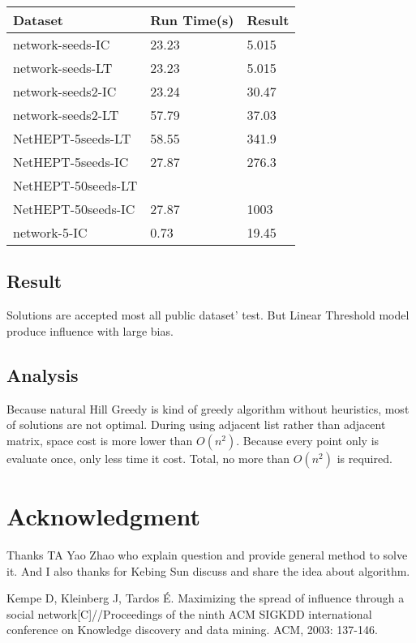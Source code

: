 \documentclass[conference,compsoc]{IEEEtran}
\begin{document}
\begin{center}
   \begin{tabular}{| l | l | l |}
   \hline
    Dataset             &Run Time(s)   &Result   \\ \hline
    network-seeds-IC     & 23.23        & 5.015  \\
    network-seeds-LT     & 23.23        & 5.015  \\
    network-seeds2-IC    & 23.24        & 30.47  \\ 
    network-seeds2-LT    & 57.79        & 37.03  \\
    NetHEPT-5seeds-LT    & 58.55        & 341.9  \\
    NetHEPT-5seeds-IC    & 27.87        & 276.3  \\
    NetHEPT-50seeds-LT    &         &   \\
    NetHEPT-50seeds-IC    & 27.87        & 1003  \\
    network-5-IC         & 0.73         & 19.45  \\
   \hline
   \end{tabular}
\end{center}

\subsection{Result}
% 
Solutions are accepted most all public dataset' test. But Linear Threshold model
produce influence with large bias. 

\subsection{Analysis}
Because natural Hill Greedy is kind of greedy algorithm without heuristics, most
of solutions are not optimal. During using adjacent list rather than adjacent
matrix, space cost is more lower than $O(n^2)$. Because every point only is
evaluate once, only less time it cost. Total, no more than $O(n^2)$ is required.

\section*{Acknowledgment}
Thanks TA Yao Zhao who explain question and provide general method to solve it.
And I also thanks for Kebing Sun discuss and share the idea about algorithm.


\begin{thebibliography}{1}
Kempe D, Kleinberg J, Tardos É. Maximizing the spread of influence through a
social network[C]//Proceedings of the ninth ACM SIGKDD international conference
on Knowledge discovery and data mining. ACM, 2003: 137-146.

\end{thebibliography}

\end{document}
